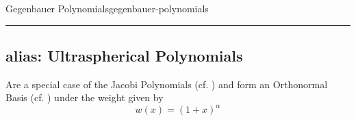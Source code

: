 \begin{definition}{Gegenbauer Polynomials}{gegenbauer-polynomials}
  \begin{center}\rule{0.5\linewidth}{0.5pt}\end{center}

  \hypertarget{alias-ultraspherical-polynomials}{%
    \subsection{alias: Ultraspherical
      Polynomials}\label{alias-ultraspherical-polynomials}}

  Are a special case of the Jacobi Polynomials (cf. ) and form an
  Orthonormal Basis (cf. ) under the weight given by
  \[w(x)=(1+x)^\alpha\]
\end{definition}
